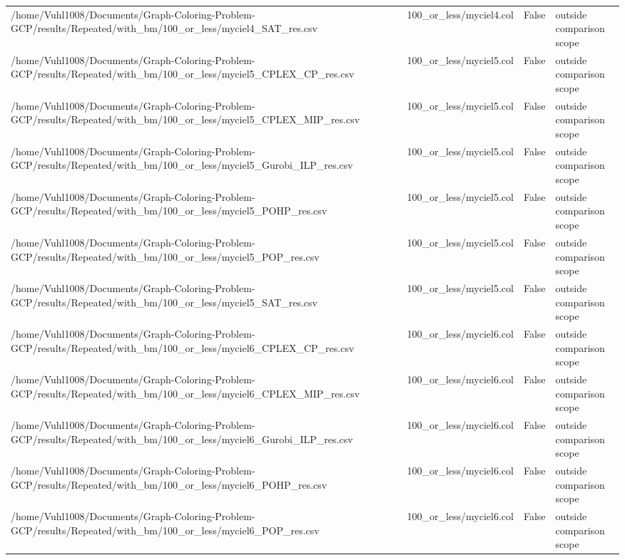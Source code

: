 \begin{table}[htbp]
\begin{tabular}{llll}
/home/Vuhl1008/Documents/Graph-Coloring-Problem-GCP/results/Repeated/with\_bm/100\_or\_less/myciel4\_SAT\_res.csv & 100\_or\_less/myciel4.col & False & outside comparison scope \\
/home/Vuhl1008/Documents/Graph-Coloring-Problem-GCP/results/Repeated/with\_bm/100\_or\_less/myciel5\_CPLEX\_CP\_res.csv & 100\_or\_less/myciel5.col & False & outside comparison scope \\
/home/Vuhl1008/Documents/Graph-Coloring-Problem-GCP/results/Repeated/with\_bm/100\_or\_less/myciel5\_CPLEX\_MIP\_res.csv & 100\_or\_less/myciel5.col & False & outside comparison scope \\
/home/Vuhl1008/Documents/Graph-Coloring-Problem-GCP/results/Repeated/with\_bm/100\_or\_less/myciel5\_Gurobi\_ILP\_res.csv & 100\_or\_less/myciel5.col & False & outside comparison scope \\
/home/Vuhl1008/Documents/Graph-Coloring-Problem-GCP/results/Repeated/with\_bm/100\_or\_less/myciel5\_POHP\_res.csv & 100\_or\_less/myciel5.col & False & outside comparison scope \\
/home/Vuhl1008/Documents/Graph-Coloring-Problem-GCP/results/Repeated/with\_bm/100\_or\_less/myciel5\_POP\_res.csv & 100\_or\_less/myciel5.col & False & outside comparison scope \\
/home/Vuhl1008/Documents/Graph-Coloring-Problem-GCP/results/Repeated/with\_bm/100\_or\_less/myciel5\_SAT\_res.csv & 100\_or\_less/myciel5.col & False & outside comparison scope \\
/home/Vuhl1008/Documents/Graph-Coloring-Problem-GCP/results/Repeated/with\_bm/100\_or\_less/myciel6\_CPLEX\_CP\_res.csv & 100\_or\_less/myciel6.col & False & outside comparison scope \\
/home/Vuhl1008/Documents/Graph-Coloring-Problem-GCP/results/Repeated/with\_bm/100\_or\_less/myciel6\_CPLEX\_MIP\_res.csv & 100\_or\_less/myciel6.col & False & outside comparison scope \\
/home/Vuhl1008/Documents/Graph-Coloring-Problem-GCP/results/Repeated/with\_bm/100\_or\_less/myciel6\_Gurobi\_ILP\_res.csv & 100\_or\_less/myciel6.col & False & outside comparison scope \\
/home/Vuhl1008/Documents/Graph-Coloring-Problem-GCP/results/Repeated/with\_bm/100\_or\_less/myciel6\_POHP\_res.csv & 100\_or\_less/myciel6.col & False & outside comparison scope \\
/home/Vuhl1008/Documents/Graph-Coloring-Problem-GCP/results/Repeated/with\_bm/100\_or\_less/myciel6\_POP\_res.csv & 100\_or\_less/myciel6.col & False & outside comparison scope \\

\end{tabular}
\end{table}
